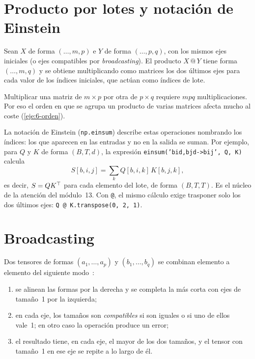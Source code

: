 \section{Producto por lotes y notación de Einstein}

\begin{definicion}
Sean $X$ de forma $(\dots,m,p)$ e $Y$ de forma $(\dots,p,q)$, con los mismos ejes iniciales (o ejes compatibles por \emph{broadcasting}). El producto $X\,@\,Y$ tiene forma $(\dots,m,q)$ y se obtiene multiplicando como matrices los dos últimos ejes para cada valor de los índices iniciales, que actúan como índices de lote.
\end{definicion}

Multiplicar una matriz de $m\times p$ por otra de $p\times q$ requiere $mpq$ multiplicaciones. Por eso el orden en que se agrupa un producto de varias matrices afecta mucho al coste (\cref{eje:6-orden}).

La notación de Einstein (\texttt{np.einsum}) describe estas operaciones nombrando los índices: los que aparecen en las entradas y no en la salida se suman. Por ejemplo, para $Q$ y $K$ de forma $(B,T,d)$, la expresión \texttt{einsum('bid,bjd->bij', Q, K)} calcula
\[
S[b,i,j]=\sum_{k}Q[b,i,k]\,K[b,j,k],
\]
es decir, $S=QK^{\top}$ para cada elemento del lote, de forma $(B,T,T)$. Es el núcleo de la atención del módulo~13. Con \texttt{@}, el mismo cálculo exige trasponer solo los dos últimos ejes: \texttt{Q @ K.transpose(0, 2, 1)}.

\section{Broadcasting}

\begin{definicion}\label{def:broadcasting}
Dos tensores de formas $(a_1,\dots,a_p)$ y $(b_1,\dots,b_q)$ se combinan elemento a elemento del siguiente modo~\cite{numpy-bc}:
\begin{enumerate}
  \item se alinean las formas por la derecha y se completa la más corta con ejes de tamaño~1 por la izquierda;
  \item en cada eje, los tamaños son \emph{compatibles} si son iguales o si uno de ellos vale~1; en otro caso la operación produce un error;
  \item el resultado tiene, en cada eje, el mayor de los dos tamaños, y el tensor con tamaño~1 en ese eje se repite a lo largo de él.
\end{enumerate}
\end{definicion}

